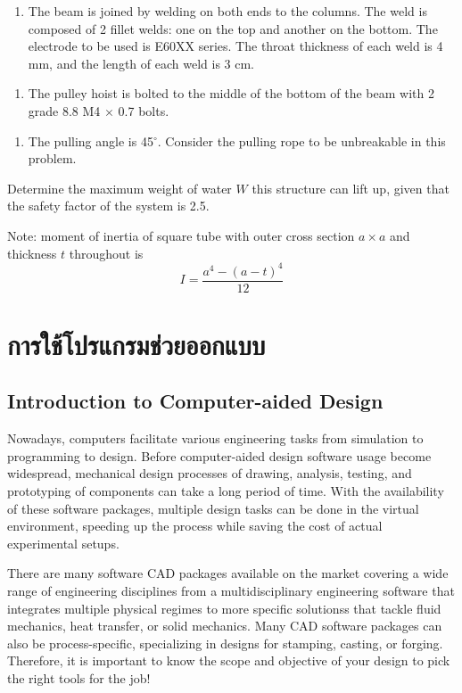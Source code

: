 \documentclass[a4paper,openany,12pt]{book}
\begin{document}
{{\hspace{1cm}
\begin{enumerate}
\item The beam is joined by welding on both ends to the columns. The weld
is composed of 2 fillet welds: one on the top and another on the
bottom. The electrode to be used is E60XX series. The throat
thickness of each weld is 4 mm, and the length of each weld is 3 cm.
\end{enumerate}


\begin{enumerate}
\item The pulley hoist is bolted to the middle of the bottom of the beam
with 2 grade 8.8 M4 \(\times\) 0.7 bolts.
\end{enumerate}


\begin{enumerate}
\item The pulling angle is 45\(^{\circ}\). Consider the pulling rope to be
unbreakable in this problem.
\end{enumerate}

Determine the maximum weight of water \(W\) this structure can lift up,
given that the safety factor of the system is 2.5.

Note: moment of inertia of square tube with outer cross section
\(a \times a\) and thickness \(t\) throughout is
$$I = \frac{a^4 - (a-t)^4}{12}$$

\part{การใช้โปรแกรมช่วยออกแบบ}
\label{the-help}
\chapter{Introduction to Computer-aided Design}
\label{introduction-to-computer-aided-design}
Nowadays, computers facilitate various engineering tasks from simulation
to programming to design. Before computer-aided design software usage
become widespread, mechanical design processes of drawing, analysis,
testing, and prototyping of components can take a long period of time.
With the availability of these software packages, multiple design tasks
can be done in the virtual environment, speeding up the process while
saving the cost of actual experimental setups.

There are many software CAD packages available on the market covering a
wide range of engineering disciplines from a multidisciplinary
engineering software that integrates multiple physical regimes to more
specific solutionss that tackle fluid mechanics, heat transfer, or solid
mechanics. Many CAD software packages can also be process-specific,
specializing in designs for stamping, casting, or forging. Therefore, it
is important to know the scope and objective of your design to pick the
right tools for the job!

}}
\end{document}
